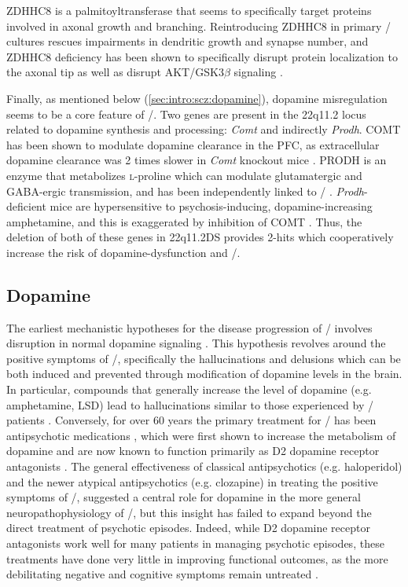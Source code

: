 ZDHHC8 is a palmitoyltransferase that seems to specifically target proteins involved in axonal growth and branching.
Reintroducing ZDHHC8 in primary \df/ cultures rescues impairments in dendritic growth and synapse number, and ZDHHC8 deficiency has been shown to specifically disrupt protein localization to the axonal tip as well as disrupt AKT/GSK3$\beta$ signaling \citep{Mukai2008, Mukai2015}.

Finally, as mentioned below (\autoref{sec:intro:scz:dopamine}), dopamine misregulation seems to be a core feature of \scz/.
Two genes are present in the 22q11.2 locus related to dopamine synthesis and processing: \emph{Comt} and indirectly \emph{Prodh}.
COMT has been shown to modulate dopamine clearance in the \ac{PFC}, as extracellular dopamine clearance was 2 times slower in \emph{Comt} knockout mice \citep{Kaenmaki2010}.
PRODH is an enzyme that metabolizes \textsc{l}-proline which can modulate glutamatergic and GABA-ergic transmission, and has been independently linked to \scz/ \citep{Liu2002}.
\emph{Prodh}-deficient mice are hypersensitive to psychosis-inducing, dopamine-increasing amphetamine, and this is exaggerated by inhibition of COMT \citep{Paterlini2005}. 
Thus, the deletion of both of these genes in 22q11.2DS provides 2-hits which cooperatively increase the risk of dopamine-dysfunction and \scz/.

\subsection{Dopamine}
\label{sec:intro:scz:dopamine}
The earliest mechanistic hypotheses for the disease progression of \scz/ involves disruption in normal dopamine signaling \citep{Matthysse1973}.
This hypothesis revolves around the positive symptoms of \scz/, specifically the hallucinations and delusions which can be both induced and prevented through modification of dopamine levels in the brain.
In particular, compounds that generally increase the level of dopamine (e.g. amphetamine, LSD) lead to hallucinations similar to those experienced by \scz/ patients \citep{Angrist1994, Lieberman1987}.
Conversely, for over 60 years the primary treatment for \scz/ has been antipsychotic medications \citep{Delay1952}, which were first shown to increase the metabolism of dopamine \citep{Carlsson1963} and are now known to function primarily as D2 dopamine receptor antagonists \citep{XXXXX}.
The general effectiveness of classical antipsychotics (e.g. haloperidol) and the newer atypical antipsychotics (e.g. clozapine) in treating the positive symptoms of \scz/, suggested a central role for dopamine in the more general neuropathophysiology of \scz/, but this insight has failed to expand beyond the direct treatment of psychotic episodes.
Indeed, while D2 dopamine receptor antagonists work well for many patients in managing psychotic episodes, these treatments have done very little in improving functional outcomes, as the more debilitating negative and cognitive symptoms remain untreated \citep{Insel2010a}.

